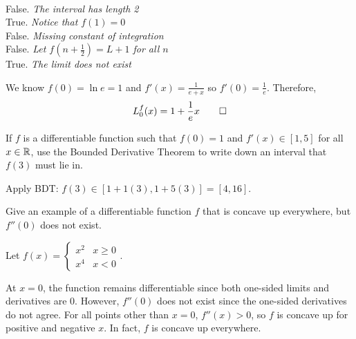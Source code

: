 \setcounter{question}{5}
 \\
False. \emph{The interval has length 2}
 \\
True. \emph{Notice that $f(1) = 0$}
 \\
False. \emph{Missing constant of integration}
 \\
False. \emph{Let $f(n+\frac12) = L+1$ for all $n$}
 \\
True. \emph{The limit does not exist}



\begin{sol}
  We know $f(0) = \ln e = 1$ and $f'(x) = \frac{1}{e+x}$ so $f'(0) = \frac{1}{e}$. Therefore,
  \[ L_0^f(x) = 1 + \frac{1}{e}x \qedhere \]
\end{sol}

\begin{prob}
  If $f$ is a differentiable function such that $f(0) = 1$ and $f'(x)\in[1,5]$ for all $x\in\mathbb{R}$,
  use the Bounded Derivative Theorem to write down an interval that $f(3)$ must lie in.
\end{prob}
\begin{sol}
  Apply BDT\@: $f(3) \in [1+1(3),1+5(3)] = [4,16]$.
\end{sol}

\begin{prob}
  Give an example of a differentiable function $f$ that is concave up everywhere,
  but $f''(0)$ does not exist.
\end{prob}
\begin{sol}
  Let $f(x) = \begin{cases} x^2 & x \geq 0 \\ x^4 & x < 0 \end{cases}$.

  At $x=0$, the function remains differentiable since both one-sided limits and derivatives are 0.
  However, $f''(0)$ does not exist since the one-sided derivatives do not agree.
  For all points other than $x=0$, $f''(x) > 0$, so $f$ is concave up for positive and negative $x$.
  In fact, $f$ is concave up everywhere.
\end{sol}

